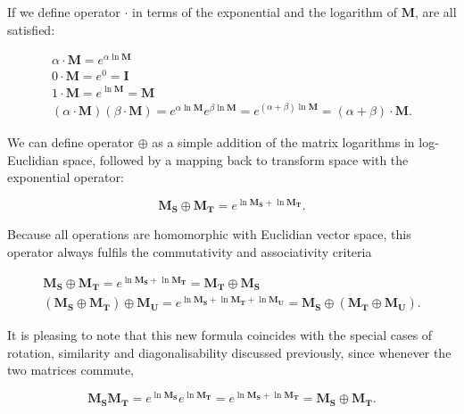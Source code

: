         If we define operator $\cdot$ in terms of the exponential and the logarithm of $\mathbf{M}$,  are all satisfied:
        
        \begin{gather}
          \alpha \cdot \mathbf{M} = e^{\alpha\ln\mathbf{M}} \\
          0 \cdot \mathbf{M} = e^0 = \mathbf{I} \\
          1 \cdot \mathbf{M} = e^{\ln\mathbf{M}} = \mathbf{M} \\
          (\alpha \cdot \mathbf{M})(\beta \cdot \mathbf{M}) = e^{\alpha\ln\mathbf{M}}e^{\beta\ln\mathbf{M}}
                                                            = e^{(\alpha + \beta)\ln\mathbf{M}}
                                                            = (\alpha + \beta) \cdot \mathbf{M}.
        \end{gather}
        
        We can define operator $\oplus$ as a simple addition of the matrix logarithms in log-Euclidian space, followed by a mapping back to transform space with the exponential operator:
        
        \begin{equation}
          \mathbf{M_S} \oplus \mathbf{M_T} = e^{\ln\mathbf{M_S} + \ln\mathbf{M_T}}.
        \end{equation}
        
        Because all operations are homomorphic with Euclidian vector space, this operator always fulfils the commutativity and associativity criteria
        
        \begin{gather}
          \mathbf{M_S} \oplus \mathbf{M_T} = e^{\ln\mathbf{M_S} + \ln\mathbf{M_T}} = \mathbf{M_T} \oplus \mathbf{M_S} \\
          (\mathbf{M_S}\oplus\mathbf{M_T})\oplus\mathbf{M_U} = e^{\ln\mathbf{M_S} + \ln\mathbf{M_T} + \ln\mathbf{M_U}} = \mathbf{M_S}\oplus(\mathbf{M_T}\oplus\mathbf{M_U}).
        \end{gather}
        
        It is pleasing to note that this new formula coincides with the special cases of rotation, similarity and diagonalisability discussed previously, since whenever the two matrices commute,
        
        \begin{equation}
          \mathbf{M_SM_T} = e^{\ln\mathbf{M_S}}e^{\ln\mathbf{M_T}} = e^{\ln\mathbf{M_S} + \ln\mathbf{M_T}} = \mathbf{M_S} \oplus \mathbf{M_T}.
        \end{equation}
        
